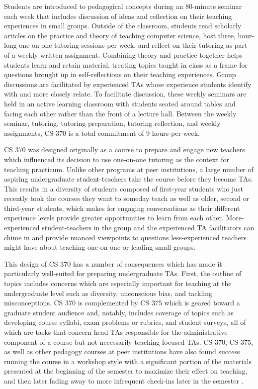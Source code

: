 Students are introduced to pedagogical concepts during an 80-minute seminar each week that includes discussion of ideas and reflection on their teaching experiences in small groups. Outside of the classroom, students read scholarly articles on the practice and theory of teaching computer science, host three, hour-long one-on-one tutoring sessions per week, and reflect on their tutoring as part of a weekly written assignment. Combining theory and practice together helps students learn and retain material, treating topics taught in class as a frame for questions brought up in self-reflections on their teaching experiences. Group discussions are facilitated by experienced TAs whose experience students identify with and more closely relate. To facilitate discussion, these weekly seminars are held in an active learning classroom with students seated around tables and facing each other rather than the front of a lecture hall. Between the weekly seminar, tutoring, tutoring preparation, tutoring reflection, and weekly assignments, CS 370 is a total commitment of 9 hours per week.

CS 370 was designed originally as a course to prepare and engage new teachers which influenced its decision to use one-on-one tutoring as the context for teaching practicum. Unlike other programs at peer institutions, a large number of aspiring undergraduate student-teachers take the course before they become TAs. This results in a diversity of students composed of first-year students who just recently took the courses they want to someday teach as well as older, second or third-year students, which makes for engaging conversations as their different experience levels provide greater opportunities to learn from each other. More-experienced student-teachers in the group and the experienced TA facilitators can chime in and provide nuanced viewpoints to questions less-experienced teachers might have about teaching one-on-one or leading small groups.

This design of CS 370 has a number of consequences which has made it particularly well-suited for preparing undergraduate TAs. First, the outline of topics includes concerns which are especially important for teaching at the undergraduate level such as diversity, unconscious bias, and tackling misconceptions. CS 370 is complemented by CS 375 which is geared toward a graduate student audience and, notably, includes coverage of topics such as developing course syllabi, exam problems or rubrics, and student surveys, all of which are tasks that concern head TAs responsible for the administrative component of a course but not necessarily teaching-focused TAs. CS 370, CS 375, as well as other pedagogy courses at peer institutions have also found success running the course in a workshop style with a significant portion of the materials presented at the beginning of the semester to maximize their effect on teaching, and then later fading away to more infrequent check-ins later in the semester \cite{Roberts:1995}.

